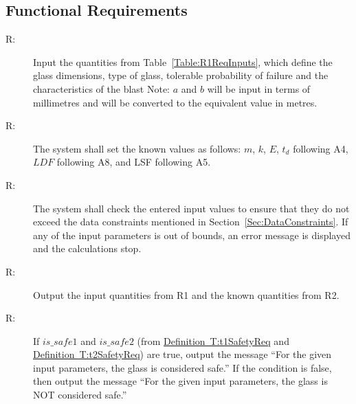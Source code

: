 \documentclass[12pt]{article}
\newcounter{reqnum}
\newcommand{\rthereqnum}{R\thereqnum}
\begin{document}
\subsection{Functional Requirements}
\label{Sec:FRs}
\begin{description}
\item[\rthereqnum\label{FR:functional.requirements.req1}:]Input the quantities from Table~\ref{Table:R1ReqInputs}, which define the glass dimensions, type of glass, tolerable probability of failure and the characteristics of the blast Note: $a$ and $b$ will be input in terms of millimetres and will be converted to the equivalent value in metres.
\end{description}
\begin{description}
\item[\rthereqnum\label{FR:functional.requirements.req2}:]The system shall set the known values as follows: $m$, $k$, $E$, ${t_{d}}$ following A4, $LDF$ following A8, and LSF following A5.
\end{description}
\begin{description}
\item[\rthereqnum\label{FR:functional.requirements.req3}:]The system shall check the entered input values to ensure that they do not exceed the data constraints mentioned in Section~\ref{Sec:DataConstraints}. If any of the input parameters is out of bounds, an error message is displayed and the calculations stop.
\end{description}
\begin{description}
\item[\rthereqnum\label{FR:functional.requirements.req4}:]Output the input quantities from R1 and the known quantities from R2.
\end{description}
\begin{description}
\item[\rthereqnum\label{FR:functional.requirements.req5}:]If $is\_safe1$ and $is\_safe2$ (from \hyperref[T:t1SafetyReq]{Definition~T:t1SafetyReq} and \hyperref[T:t2SafetyReq]{Definition~T:t2SafetyReq}) are true, output the message ``For the given input parameters, the glass is considered safe.'' If the condition is false, then output the message ``For the given input parameters, the glass is NOT considered safe.''
\end{description}
\end{document}
